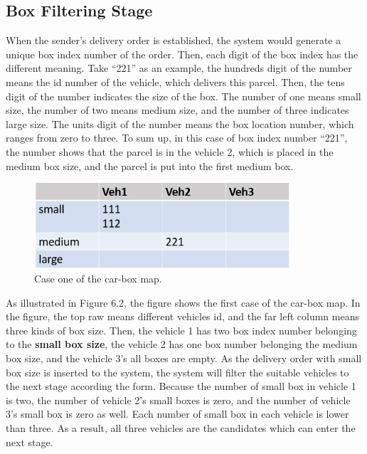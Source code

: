 \documentclass[12pt]{ksthesis}
\begin{document}
\begin{thesis}
{\section{Box Filtering Stage }
When the sender’s delivery order is established, the system would generate a unique box index number of the order. Then, each digit of the box index has the different meaning. Take “221” as an example, the hundreds digit of the number means the id number of the vehicle, which delivers this parcel. Then, the tens digit of the number indicates the size of the box. The number of one means small size, the number of two means medium size, and the number of three indicates large size. The units digit of the number means the box location number, which ranges from zero to three. 
To sum up, in this case of box index number “221”, the number shows that the parcel is in the vehicle 2, which is placed in the medium box size, and the parcel is put into the first medium box.

\begin{figure}[H]
\centering
\includegraphics[width=0.85\textwidth]{./Thesis_figures/F6-2_caseOne_boxFiltering.PNG}
\caption{\large Case one of the car-box map.}
\vspace{0.5cm}
\label{Fig:CaseOne_carBox_Map}
\end{figure}

As illustrated in Figure 6.2, the figure shows the first case of the car-box map. In the figure, the top raw means different vehicles id, and the far left column means three kinds of box size. Then, the vehicle 1 has two box index number belonging to the \textbf{small box size}, the vehicle 2 has one box number belonging the medium box size, and the vehicle 3’s all boxes are empty.
As the delivery order with small box size is inserted to the system, the system will filter the suitable vehicles to the next stage according the form. Because the number of small box in vehicle 1 is two, the number of vehicle 2’s small boxes is zero, and the number of vehicle 3’s small box is zero as well. Each number of small box in each vehicle is lower than three. As a result, all three vehicles are the candidates which can enter the next stage.

}
\end{thesis}
\end{document}
